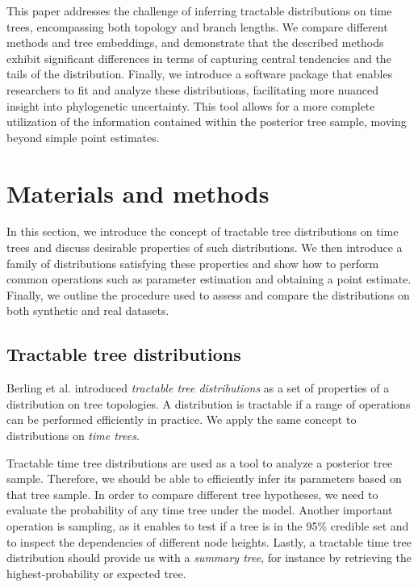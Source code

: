 \documentclass[10pt,letterpaper]{article}
\begin{document}
This paper addresses the challenge of inferring tractable distributions on time trees, encompassing both topology and branch lengths. We compare different methods and tree embeddings, and demonstrate that the described methods exhibit significant differences in terms of capturing central tendencies and the tails of the distribution. Finally, we introduce a software package that enables researchers to fit and analyze these distributions, facilitating more nuanced insight into phylogenetic uncertainty. This tool allows for a more complete utilization of the information contained within the posterior tree sample, moving beyond simple point estimates.

\section*{Materials and methods}

In this section, we introduce the concept of tractable tree distributions on time trees and discuss desirable properties of such distributions. We then introduce a family of distributions satisfying these properties and show how to perform common operations such as parameter estimation and obtaining a point estimate. Finally, we outline the procedure used to assess and compare the distributions on both synthetic and real datasets.

\subsection*{Tractable tree distributions}

Berling et al. \cite{ccd} introduced \emph{tractable tree distributions} as a set of properties of a distribution on tree topologies. A distribution is tractable if a range of operations can be performed efficiently in practice. We apply the same concept to distributions on \emph{time trees}.

Tractable time tree distributions are used as a tool to analyze a posterior tree sample. Therefore, we should be able to efficiently infer its parameters based on that tree sample. In order to compare different tree hypotheses, we need to evaluate the probability of any time tree under the model. Another important operation is sampling, as it enables to test if a tree is in the 95\% credible set and to inspect the dependencies of different node heights. Lastly, a tractable time tree distribution should provide us with a \emph{summary tree}, for instance by retrieving the highest-probability or expected tree.
\end{document}
